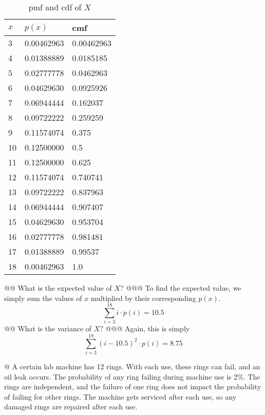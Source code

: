\documentclass[10pt]{article}
\begin{document}
\begin{easylist}[enumerate]
        \begin{table}[!ht]
            \centering
            \begin{tabular}{|l|l|l|}
                \hline
                $x$ & $p(x)$ & cmf\\
                \hline
                3 & 0.00462963 & 0.00462963\\
                4 & 0.01388889 & 0.0185185\\
                5 & 0.02777778 & 0.0462963\\
                6 & 0.04629630 & 0.0925926\\
                7 & 0.06944444 & 0.162037\\
                8 & 0.09722222 & 0.259259\\
                9 & 0.11574074 & 0.375\\
                10 & 0.12500000 & 0.5\\
                11 & 0.12500000 & 0.625\\
                12 & 0.11574074 & 0.740741\\
                13 & 0.09722222 & 0.837963\\
                14 & 0.06944444 & 0.907407\\
                15 & 0.04629630 & 0.953704\\
                16 & 0.02777778 & 0.981481\\
                17 & 0.01388889 & 0.99537\\
                18 & 0.00462963 & 1.0\\
                \hline
            \end{tabular}
            \caption{pmf and cdf of $X$}
            \label{table:pmf}
        \end{table}

    @@ What is the expected value of $X$?
    @@@ To find the expected value, we simply sum the values of $x$ multiplied by their corresponding $p(x)$.
        \[ \sum^{18}_{i=3} i \cdot p(i) = \boxed{10.5} \]
    @@ What is the variance of $X$?
    @@@ Again, this is simply
        \[ \sum^{18}_{i=3} {(i - 10.5)}^2 \cdot p(i) = \boxed{8.75} \]

    @ A certain lab machine has 12 rings. With each use, these rings can fail, and an oil leak occurs. The probability
    of any ring failing during machine use is 2\%. The rings are independent, and the failure of one ring does not
    impact the probability of failing for other rings. The machine gets serviced after each use, so any damaged rings
    are repaired after each use.\newline


\end{easylist}
\end{document}
